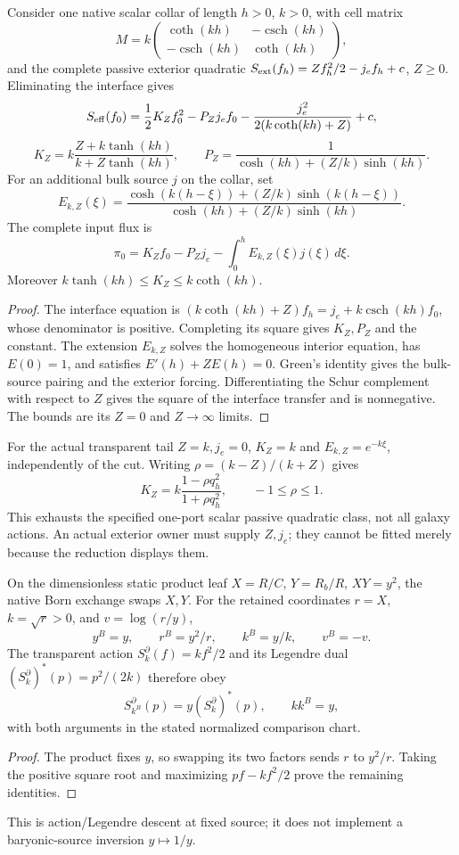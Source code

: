 \documentclass[11pt,a4paper]{article}
\begin{document}
\begin{theorem}
\label{p3f:thm:v2109-passive-exterior}
Consider one native scalar collar of length \(h>0\), \(k>0\), with cell
matrix
\[
 M=k\begin{pmatrix}\coth(kh)&-\operatorname{csch}(kh)\\
 -\operatorname{csch}(kh)&\coth(kh)\end{pmatrix},
\]
and the complete passive exterior quadratic
\(S_{\rm ext}(f_h)=Zf_h^2/2-j_ef_h+c\), \(Z\ge0\).
Eliminating the interface gives
\[
 S_{\rm eff}(f_0)=\frac12K_Zf_0^2-P_Zj_ef_0
 -\frac{j_e^2}{2(k\coth(kh)+Z)}+c,
\]
\[
 K_Z=k\frac{Z+k\tanh(kh)}{k+Z\tanh(kh)},\qquad
 P_Z=\frac1{\cosh(kh)+(Z/k)\sinh(kh)}.
\]
For an additional bulk source \(j\) on the collar, set
\[
 E_{k,Z}(\xi)=
 \frac{\cosh(k(h-\xi))+(Z/k)\sinh(k(h-\xi))}
 {\cosh(kh)+(Z/k)\sinh(kh)}.
\]
The complete input flux is
\[
 \pi_0=K_Zf_0-P_Zj_e-\int_0^hE_{k,Z}(\xi)j(\xi)\,d\xi.
\]
Moreover \(k\tanh(kh)\le K_Z\le k\coth(kh)\).
\end{theorem}
\begin{proof}
The interface equation is
\((k\coth(kh)+Z)f_h=j_e+k\operatorname{csch}(kh)f_0\),
whose denominator is positive.  Completing its square gives \(K_Z,P_Z\)
and the constant.  The extension \(E_{k,Z}\) solves the homogeneous
interior equation, has \(E(0)=1\), and satisfies \(E'(h)+ZE(h)=0\).
Green's identity gives the bulk-source pairing and the exterior forcing.
Differentiating the Schur complement with respect to \(Z\) gives the
square of the interface transfer and is nonnegative.  The bounds are its
\(Z=0\) and \(Z\to\infty\) limits.
\end{proof}
For the actual transparent tail \(Z=k,j_e=0\),
\(K_Z=k\) and \(E_{k,Z}=e^{-k\xi}\), independently of the cut.
Writing \(\rho=(k-Z)/(k+Z)\) gives
\[
 K_Z=k\frac{1-\rho q_h^2}{1+\rho q_h^2},\qquad -1\le\rho\le1.
\]
This exhausts the specified one-port scalar passive quadratic class, not
all galaxy actions.  An actual exterior owner must supply \(Z,j_e\);
they cannot be fitted merely because the reduction displays them.

\begin{proposition}
\label{p3f:prop:v2109-born-legendre-fixed-source}
On the dimensionless static product leaf \(X=R/C\), \(Y=R_b/R\),
\(XY=y^2\), the native Born exchange swaps \(X,Y\).  For the retained
coordinates \(r=X\), \(k=\sqrt r>0\), and \(v=\log(r/y)\),
\[
 y^B=y,\qquad r^B=y^2/r,\qquad k^B=y/k,\qquad v^B=-v.
\]
The transparent action \(S_k^\partial(f)=kf^2/2\) and its Legendre dual
\((S_k^\partial)^*(p)=p^2/(2k)\) therefore obey
\[
 S_{k^B}^\partial(p)=y(S_k^\partial)^*(p),\qquad kk^B=y,
\]
with both arguments in the stated normalized comparison chart.
\end{proposition}
\begin{proof}
The product fixes \(y\), so swapping its two factors sends
\(r\) to \(y^2/r\).  Taking the positive square root and maximizing
\(pf-kf^2/2\) prove the remaining identities.
\end{proof}
This is action/Legendre descent at fixed source; it does not implement a
baryonic-source inversion \(y\mapsto1/y\).
\end{document}
